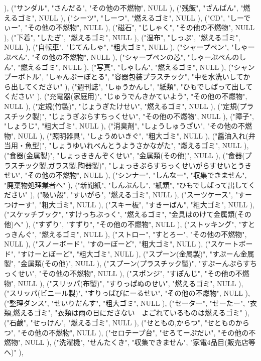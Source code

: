 ), ("サンダル", "さんだる", "その他の不燃物", NULL
), ("残飯", "ざんぱん", "燃えるゴミ", NULL
), ("シーツ", "しーつ", "燃えるゴミ", NULL
), ("CD", "しーでぃー", "その他の不燃物", NULL
), ("磁石", "じしゃく", "その他の不燃物", NULL
), ("下着", "したぎ", "燃えるゴミ", NULL
), ("湿布", "しっぷ", "燃えるゴミ", NULL
), ("自転車", "じてんしゃ", "粗大ゴミ", NULL
), ("シャープペン", "しゃーぷぺん", "その他の不燃物", NULL
), ("シャープペンの芯", "しゃーぷぺんのしん", "燃えるゴミ", NULL
), ("写真", "しゃしん", "燃えるゴミ", NULL
), ("シャンプーボトル", "しゃんぷーぼとる", "容器包装プラスチック", "中を水洗いしてから出してください"
), ("週刊誌", "しゅうかんし", "紙類", "ひもでしばって出してください"
), ("充電器(家庭用)", "じゅうでんきかていよう", "その他の不燃物", NULL
), ("定規(竹製)", "じょうぎたけせい", "燃えるゴミ", NULL
), ("定規(プラスチック製)", "じょうぎぷらすちっくせい", "その他の不燃物", NULL
), ("障子", "しょうじ", "粗大ゴミ", NULL
), ("消臭剤", "しょうしゅうざい", "その他の不燃物", NULL
), ("照明器具", "しょうめいきぐ", "粗大ゴミ", NULL
), ("醤油入れ(弁当用・魚型)", "しょうゆいれべんとうようさかながた", "燃えるゴミ", NULL
), ("食器(金属製)", "しょっききんぞくせい", "金属類(その他)", NULL
), ("食器(プラスチック製,ガラス製,陶器製)", "しょっきぷらすちっくせいがらすせいとうきせい", "その他の不燃物", NULL
), ("シンナー", "しんなー", "収集できません", "廃棄物処理業者へ"
), ("新聞紙", "しんぶんし", "紙類", "ひもでしばって出してください"
), ("吸い殻", "すいがら", "燃えるゴミ", NULL
), ("スーツケース", "すーつけーす", "粗大ゴミ", NULL
), ("スキー板", "すきーばん", "粗大ゴミ", NULL
), ("スケッチブック", "すけっちぶっく", "燃えるゴミ", "金具はのけて金属類(その他)へ"
), ("すずり", "すずり", "その他の不燃物", NULL
), ("ストッキング", "すとっきんぐ", "燃えるゴミ", NULL
), ("ストロー", "すとろー", "その他の不燃物", NULL
), ("スノーボード", "すのーぼーど", "粗大ゴミ", NULL
), ("スケートボード", "すけーとぼーど", "粗大ゴミ", NULL
), ("スプーン(金属製)", "すぷーん金属製", "金属類(その他)", NULL
), ("スプーン(プラスチック製)", "すぷーんぷらすちっくせい", "その他の不燃物", NULL
), ("スポンジ", "すぽんじ", "その他の不燃物", NULL
), ("スリッパ(布製)", "すりっぱぬのせい", "燃えるゴミ", NULL
), ("スリッパ(ビニール製)", "すりっぱびにーるせい", "その他の不燃物", NULL
), ("整理ダンス", "せいりだんす", "粗大ゴミ", NULL
), ("セーター", "せーたー", "衣類,燃えるゴミ", "衣類は雨の日にださない　よごれているものは燃えるゴミ"
), ("石鹸", "せっけん", "燃えるゴミ", NULL
), ("せともの,からつ", "せとものからつ", "その他の不燃物", NULL
), ("セロテープ台", "せろてーぷだい", "その他の不燃物", NULL
), ("洗濯機", "せんたくき", "収集できません", "家電4品目(販売店等へ)"
),
